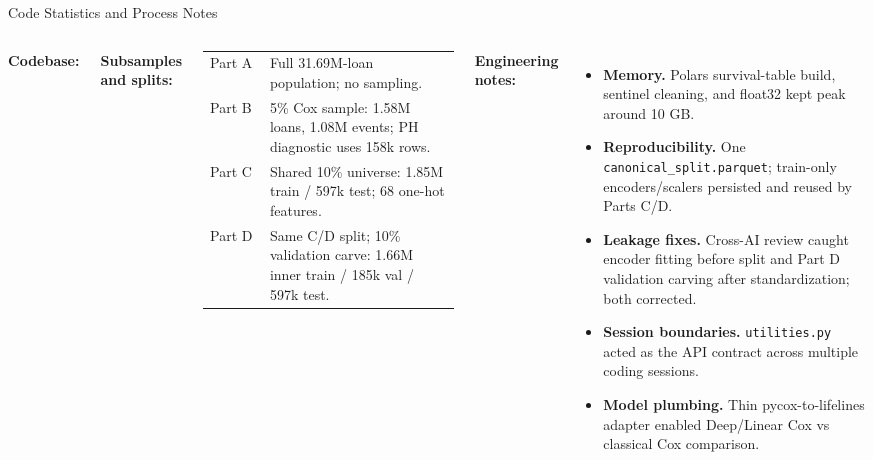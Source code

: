 \documentclass[10pt,aspectratio=169]{beamer}
\begin{document}
\begin{frame}{Code Statistics and Process Notes}

    \begin{columns}[T,onlytextwidth]
        \textbf{Codebase:}

        \vspace{0.5em}

        \textbf{Subsamples and splits:}
        \begin{tabular}{p{0.22\linewidth}p{0.70\linewidth}}
            Part A & Full 31.69M-loan population; no sampling.                                        \\
            Part B & 5\% Cox sample: 1.58M loans, 1.08M events; PH diagnostic uses 158k rows.         \\
            Part C & Shared 10\% universe: 1.85M train / 597k test; 68 one-hot features.              \\
            Part D & Same C/D split; 10\% validation carve: 1.66M inner train / 185k val / 597k test. \\
        \end{tabular}

        \textbf{Engineering notes:}
        \begin{itemize}\itemsep2pt
            \small
            \item \textbf{Memory.} Polars survival-table build, sentinel cleaning, and float32 kept peak around 10 GB.

            \item \textbf{Reproducibility.} One \texttt{canonical\_split.parquet}; train-only encoders/scalers persisted and reused by Parts C/D.

            \item \textbf{Leakage fixes.} Cross-AI review caught encoder fitting before split and Part D validation carving after standardization; both corrected.

            \item \textbf{Session boundaries.} \texttt{utilities.py} acted as the API contract across multiple coding sessions.

            \item \textbf{Model plumbing.} Thin pycox-to-lifelines adapter enabled Deep/Linear Cox vs classical Cox comparison.
        \end{itemize}
    \end{columns}

\end{frame}
\end{document}
